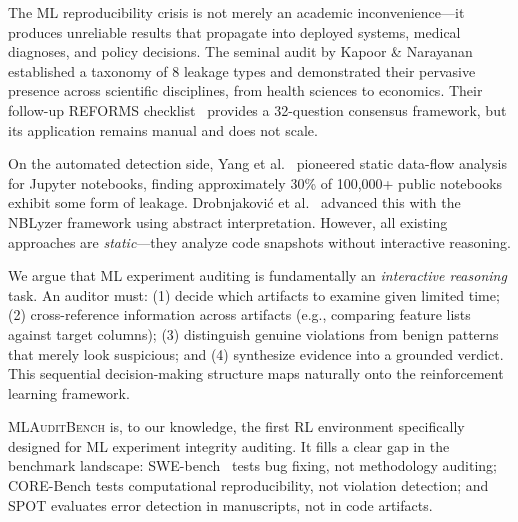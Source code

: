 \documentclass{article}
\begin{document}
The ML reproducibility crisis is not merely an academic inconvenience---it
produces unreliable results that propagate into deployed systems, medical
diagnoses, and policy decisions.  The seminal audit by Kapoor \&
Narayanan~\cite{kapoor2023leakage} established a taxonomy of 8 leakage
types and demonstrated their pervasive presence across scientific
disciplines, from health sciences to economics.  Their follow-up REFORMS
checklist~\cite{kapoor2024reforms} provides a 32-question consensus
framework, but its application remains manual and does not scale.

On the automated detection side, Yang et al.~\cite{yang2022data} pioneered
static data-flow analysis for Jupyter notebooks, finding approximately
30\% of 100,000+ public notebooks exhibit some form of leakage.
Drobnjakovi\'c et al.~\cite{drobnjakovic2024tase} advanced this with the
NBLyzer framework using abstract interpretation.  However, all existing
approaches are \emph{static}---they analyze code snapshots without
interactive reasoning.

We argue that ML experiment auditing is fundamentally an \emph{interactive
reasoning} task.  An auditor must: (1) decide which artifacts to examine
given limited time; (2) cross-reference information across artifacts (e.g.,
comparing feature lists against target columns); (3) distinguish genuine
violations from benign patterns that merely look suspicious; and (4)
synthesize evidence into a grounded verdict.  This sequential
decision-making structure maps naturally onto the reinforcement learning
framework.

\textsc{MLAuditBench} is, to our knowledge, the first RL environment
specifically designed for ML experiment integrity auditing.  It fills a
clear gap in the benchmark landscape: SWE-bench~\cite{jimenez2024swebench}
tests bug fixing, not methodology auditing; CORE-Bench tests computational
reproducibility, not violation detection; and SPOT evaluates error
detection in manuscripts, not in code artifacts.
\end{document}
